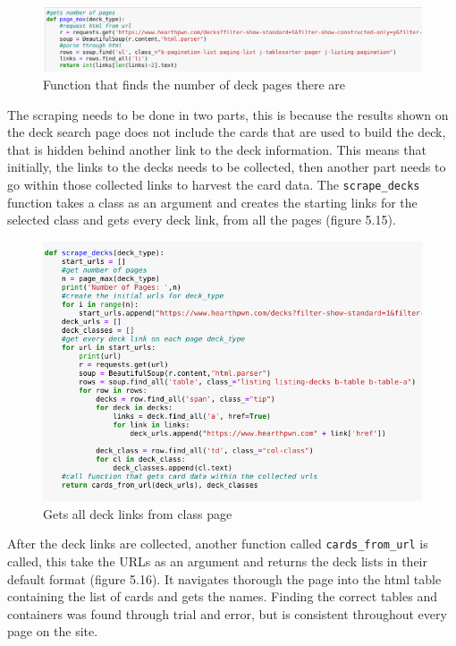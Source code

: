 \documentclass{report} %
\begin{document}
\begin{figure}[H]
\centering
\includegraphics[width=1.25\textwidth]{pageMax}
\caption{Function that finds the number of deck pages there are\protect}
\label{board}
\end{figure}

The scraping needs to be done in two parts, this is because the results shown on the deck search page does not include the cards that are used to build the deck, that is hidden behind another link to the deck information. This means that initially, the links to the decks needs to be collected, then another part needs to go within those collected links to harvest the card data. The \nolinkurl{scrape_decks} function takes a class as an argument and creates the starting links for the selected class and gets every deck link, from all the pages (figure 5.15).

\begin{figure}[H]
\centering
\includegraphics[width=1.25\textwidth]{scrapeDecks}
\caption{Gets all deck links from class page\protect}
\label{board}
\end{figure}

After the deck links are collected, another function called \nolinkurl{cards_from_url} is called, this take the URLs as an argument and returns the deck lists in their default format (figure 5.16). It navigates thorough the page into the html table containing the list of cards and gets the names. Finding the correct tables and containers was found through trial and error, but is consistent throughout every page on the site.
\end{document}
